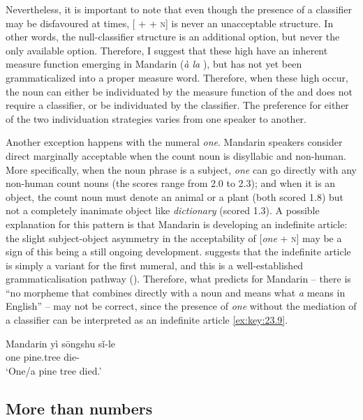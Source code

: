 \documentclass[output=paper]{langsci/langscibook}
\begin{document}
Nevertheless, it is important to note that even though the presence of a
classifier may be disfavoured at times, [\Num{} + \Clf{} + \textsc{n}] is never
an unacceptable structure. In other words, the null-classifier structure is an
additional option, but never the only available option. Therefore, I suggest
that these high  have an inherent measure function emerging in
Mandarin (\emph{à la} \citealt{Krifka1995}), but has not yet been
grammaticalized into a proper measure word. Therefore,
when these high  occur, the noun can either be individuated by
the measure function of the  and does not require a
classifier, or be individuated by the
classifier. The preference for either of the two individuation
strategies varies from one speaker to another.

Another exception happens with the numeral \emph{one}. Mandarin speakers
consider direct  marginally acceptable when the count noun is
disyllabic and non-human. More specifically, when the noun phrase is a subject,
\emph{one} can go directly with any non-human count nouns (the scores range
from 2.0 to 2.3); and when it is an object, the count noun must denote an
animal or a plant (both scored 1.8) but not a completely inanimate object like
\emph{dictionary} (scored 1.3). A possible explanation for this pattern is
that Mandarin is developing an indefinite article: the slight subject-object
asymmetry in the acceptability of [\emph{one} + \textsc{n}] may be a sign of this being
a still ongoing development. \citet{Chierchia1998} suggests that the indefinite
article is simply a variant for the first numeral, and this is a
well-established grammaticalisation pathway (\citealt{HeineKuteva2002}).
Therefore, what \citeauthor{Chierchia1998} predicts for Mandarin -- there is
“no morpheme that combines directly with a noun and means what \emph{a} means
in English” \parencite[91]{Chierchia1998} -- may not be correct, since the
presence of \emph{one} without the mediation of a classifier
can be interpreted as an indefinite article \eqref{ex:key:23.9}.

\ea\label{ex:key:23.9} Mandarin %
    \sn
    \gll yì sōngshu sǐ-le\\
    	one pine.tree die-\Pfv{}\\
    \glt `One/a pine tree died.'
\z

\subsection{More than numbers}\label{sub:23.2.3}
\end{document}

